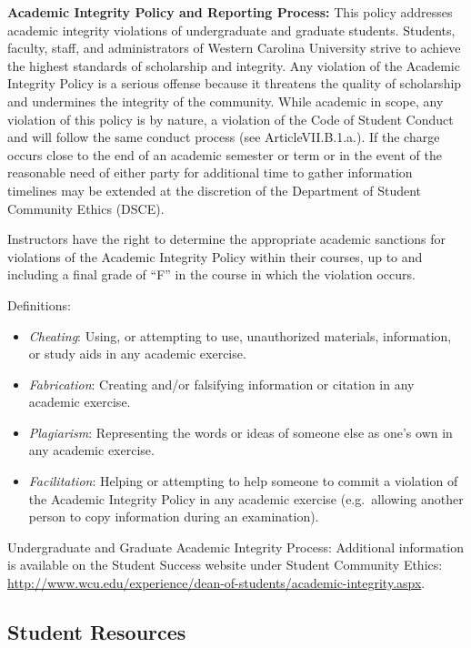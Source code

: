 \documentclass[]{tufte-book}
\providecommand{\tightlist}{%
  \setlength{\itemsep}{0pt}\setlength{\parskip}{0pt}}
\begin{document}
\textbf{Academic Integrity Policy and Reporting Process:} This policy addresses academic integrity violations of undergraduate and graduate students. Students, faculty, staff, and administrators of Western Carolina University strive to achieve the highest standards of scholarship and integrity. Any violation of the Academic Integrity Policy is a serious offense because it threatens the quality of scholarship and undermines the integrity of the community. While academic in scope, any violation of this policy is by nature, a violation of the Code of Student Conduct and will follow the same conduct process (see ArticleVII.B.1.a.). If the charge occurs close to the end of an academic semester or term or in the event of the reasonable need of either party for additional time to gather information timelines may be extended at the discretion of the Department of Student Community Ethics (DSCE).

Instructors have the right to determine the appropriate academic sanctions for violations of the Academic Integrity Policy within their courses, up to and including a final grade of ``F'' in the course in which the violation occurs.

Definitions:

\begin{itemize}
\tightlist
\item
  \emph{Cheating}: Using, or attempting to use, unauthorized materials, information, or study aids in any academic exercise.
\item
  \emph{Fabrication}: Creating and/or falsifying information or citation in any academic exercise.
\item
  \emph{Plagiarism}: Representing the words or ideas of someone else as one's own in any academic exercise.
\item
  \emph{Facilitation}: Helping or attempting to help someone to commit a violation of the Academic Integrity Policy in any academic exercise (e.g.~allowing another person to copy information during an examination).
\end{itemize}

Undergraduate and Graduate Academic Integrity Process: Additional information is available on the Student Success website under Student Community Ethics: \url{http://www.wcu.edu/experience/dean-of-students/academic-integrity.aspx}.

\hypertarget{student-resources}{%
\subsection*{Student Resources}\label{student-resources}}
\end{document}
